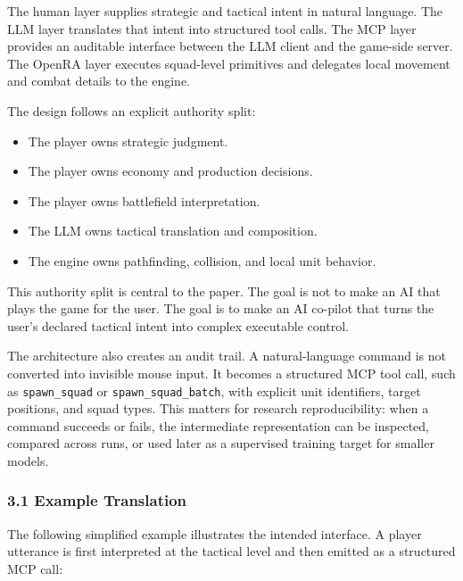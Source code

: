 \documentclass[
  journal]{IEEEtran}
\providecommand{\tightlist}{%
  \setlength{\itemsep}{0pt}\setlength{\parskip}{0pt}}
\begin{document}
The human layer supplies strategic and tactical intent in natural
language. The LLM layer translates that intent into structured tool
calls. The MCP layer provides an auditable interface between the LLM
client and the game-side server. The OpenRA layer executes squad-level
primitives and delegates local movement and combat details to the
engine.

The design follows an explicit authority split:

\begin{itemize}
\tightlist
\item
  The player owns strategic judgment.
\item
  The player owns economy and production decisions.
\item
  The player owns battlefield interpretation.
\item
  The LLM owns tactical translation and composition.
\item
  The engine owns pathfinding, collision, and local unit behavior.
\end{itemize}

This authority split is central to the paper. The goal is not to make an
AI that plays the game for the user. The goal is to make an AI co-pilot
that turns the user's declared tactical intent into complex executable
control.

The architecture also creates an audit trail. A natural-language command
is not converted into invisible mouse input. It becomes a structured MCP
tool call, such as \texttt{spawn\_squad} or
\texttt{spawn\_squad\_batch}, with explicit unit identifiers, target
positions, and squad types. This matters for research reproducibility:
when a command succeeds or fails, the intermediate representation can be
inspected, compared across runs, or used later as a supervised training
target for smaller models.

\subsubsection{3.1 Example Translation}\label{example-translation}

The following simplified example illustrates the intended interface. A
player utterance is first interpreted at the tactical level and then
emitted as a structured MCP call:
\end{document}
